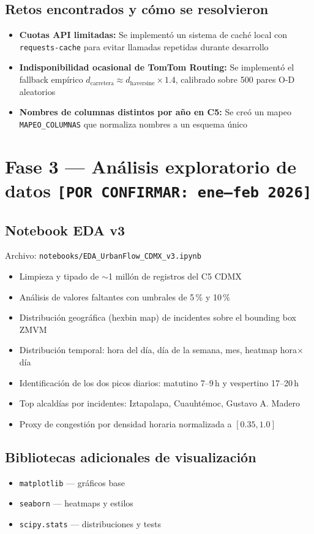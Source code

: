 \documentclass[11pt,a4paper]{article}
\begin{document}
\subsection{Retos encontrados y cómo se resolvieron}
\begin{itemize}
  \item \textbf{Cuotas API limitadas:} Se implementó un sistema de caché local con \texttt{requests-cache} para evitar llamadas repetidas durante desarrollo
  \item \textbf{Indisponibilidad ocasional de TomTom Routing:} Se implementó el fallback empírico $d_{\text{carretera}} \approx d_{\text{haversine}} \times 1.4$, calibrado sobre 500 pares O-D aleatorios
  \item \textbf{Nombres de columnas distintos por año en C5:} Se creó un mapeo \texttt{MAPEO\_COLUMNAS} que normaliza nombres a un esquema único
\end{itemize}

\section{Fase 3 --- Análisis exploratorio de datos \texttt{[POR CONFIRMAR: ene--feb 2026]}}

\subsection{Notebook EDA v3}
Archivo: \texttt{notebooks/EDA\_UrbanFlow\_CDMX\_v3.ipynb}
\begin{itemize}
  \item Limpieza y tipado de $\sim$1 millón de registros del C5 CDMX
  \item Análisis de valores faltantes con umbrales de 5\,\% y 10\,\%
  \item Distribución geográfica (hexbin map) de incidentes sobre el bounding box ZMVM
  \item Distribución temporal: hora del día, día de la semana, mes, heatmap hora$\times$día
  \item Identificación de los dos picos diarios: matutino 7--9\,h y vespertino 17--20\,h
  \item Top alcaldías por incidentes: Iztapalapa, Cuauhtémoc, Gustavo A. Madero
  \item Proxy de congestión por densidad horaria normalizada a $[0.35, 1.0]$
\end{itemize}

\subsection{Bibliotecas adicionales de visualización}
\begin{itemize}
  \item \texttt{matplotlib} --- gráficos base
  \item \texttt{seaborn} --- heatmaps y estilos
  \item \texttt{scipy.stats} --- distribuciones y tests
\end{itemize}
\end{document}
